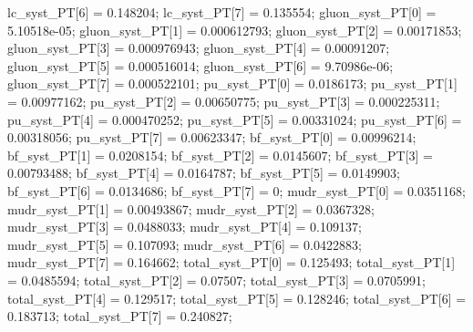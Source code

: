 lc_syst_PT[6] = 0.148204; lc_syst_PT[7] = 0.135554; 
gluon_syst_PT[0] = 5.10518e-05; gluon_syst_PT[1] = 0.000612793; gluon_syst_PT[2] = 0.00171853; 
gluon_syst_PT[3] = 0.000976943; gluon_syst_PT[4] = 0.00091207; gluon_syst_PT[5] = 0.000516014; 
gluon_syst_PT[6] = 9.70986e-06; gluon_syst_PT[7] = 0.000522101; 
pu_syst_PT[0] = 0.0186173; pu_syst_PT[1] = 0.00977162; pu_syst_PT[2] = 0.00650775; 
pu_syst_PT[3] = 0.000225311; pu_syst_PT[4] = 0.000470252; pu_syst_PT[5] = 0.00331024; 
pu_syst_PT[6] = 0.00318056; pu_syst_PT[7] = 0.00623347; 
bf_syst_PT[0] = 0.00996214; bf_syst_PT[1] = 0.0208154; bf_syst_PT[2] = 0.0145607; 
bf_syst_PT[3] = 0.00793488; bf_syst_PT[4] = 0.0164787; bf_syst_PT[5] = 0.0149903; 
bf_syst_PT[6] = 0.0134686; bf_syst_PT[7] = 0; 
mudr_syst_PT[0] = 0.0351168; mudr_syst_PT[1] = 0.00493867; mudr_syst_PT[2] = 0.0367328; 
mudr_syst_PT[3] = 0.0488033; mudr_syst_PT[4] = 0.109137; mudr_syst_PT[5] = 0.107093; 
mudr_syst_PT[6] = 0.0422883; mudr_syst_PT[7] = 0.164662; 
total_syst_PT[0] = 0.125493; total_syst_PT[1] = 0.0485594; total_syst_PT[2] = 0.07507; 
total_syst_PT[3] = 0.0705991; total_syst_PT[4] = 0.129517; total_syst_PT[5] = 0.128246; 
total_syst_PT[6] = 0.183713; total_syst_PT[7] = 0.240827; 



